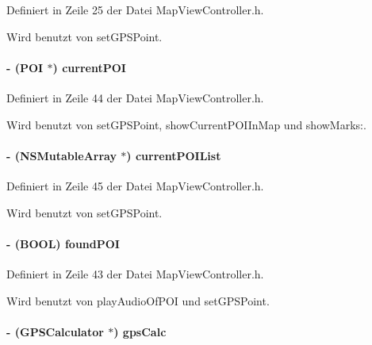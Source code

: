 Definiert in Zeile 25 der Datei MapViewController.h.

Wird benutzt von setGPSPoint.\hypertarget{interface_map_view_controller_a9c11e3ae9fc617f0c978ef3cf9f3e867}{
\paragraph[{currentPOI}]{\setlength{\rightskip}{0pt plus 5cm}-\/ ({\bf POI} $\ast$) currentPOI}\hfill}
\label{interface_map_view_controller_a9c11e3ae9fc617f0c978ef3cf9f3e867}


Definiert in Zeile 44 der Datei MapViewController.h.

Wird benutzt von setGPSPoint, showCurrentPOIInMap und showMarks:.\hypertarget{interface_map_view_controller_aa20f046169a89b035199e22efae744d2}{
\paragraph[{currentPOIList}]{\setlength{\rightskip}{0pt plus 5cm}-\/ (NSMutableArray $\ast$) currentPOIList}\hfill}
\label{interface_map_view_controller_aa20f046169a89b035199e22efae744d2}


Definiert in Zeile 45 der Datei MapViewController.h.

Wird benutzt von setGPSPoint.\hypertarget{interface_map_view_controller_ac4ce9dd86dc3db11a6573ae2bccfecc6}{
\paragraph[{foundPOI}]{\setlength{\rightskip}{0pt plus 5cm}-\/ (BOOL) foundPOI}\hfill}
\label{interface_map_view_controller_ac4ce9dd86dc3db11a6573ae2bccfecc6}


Definiert in Zeile 43 der Datei MapViewController.h.

Wird benutzt von playAudioOfPOI und setGPSPoint.\hypertarget{interface_map_view_controller_a8da7a737d0d98fc23afd9e6dbf766026}{
\paragraph[{gpsCalc}]{\setlength{\rightskip}{0pt plus 5cm}-\/ ({\bf GPSCalculator} $\ast$) gpsCalc}\hfill}
\label{interface_map_view_controller_a8da7a737d0d98fc23afd9e6dbf766026}


